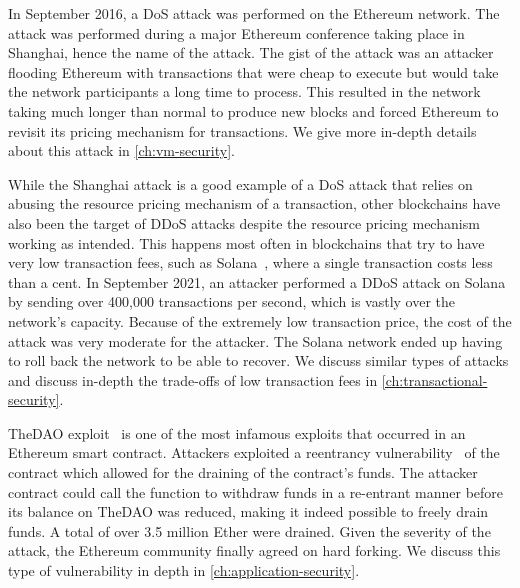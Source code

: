 In September 2016, a DoS attack was performed on the Ethereum network.
The attack was performed during a major Ethereum conference taking place in Shanghai, hence the name of the attack.
The gist of the attack was an attacker flooding Ethereum with transactions that were cheap to execute but would take the network participants a long time to process.
This resulted in the network taking much longer than normal to produce new blocks and forced Ethereum to revisit its pricing mechanism for transactions.
We give more in-depth details about this attack in \autoref{ch:vm-security}.

While the Shanghai attack is a good example of a DoS attack that relies on abusing the resource pricing mechanism of a transaction, other blockchains have also been the target of DDoS attacks despite the resource pricing mechanism working as intended.
This happens most often in blockchains that try to have very low transaction fees, such as Solana~\cite{solana}, where a single transaction costs less than a cent.
In September 2021, an attacker performed a DDoS attack on Solana by sending over 400,000 transactions per second, which is vastly over the network's capacity.
Because of the extremely low transaction price, the cost of the attack was very moderate for the attacker.
The Solana network ended up having to roll back the network to be able to recover.
We discuss similar types of attacks and discuss in-depth the trade-offs of low transaction fees in \autoref{ch:transactional-security}.

TheDAO exploit~\cite{securities2017} is one of the most infamous exploits that occurred in an Ethereum smart contract.
Attackers exploited a reentrancy vulnerability~\cite{atzei2017} of the contract which allowed for the draining of the contract's funds.
The attacker contract could call the function to withdraw funds in a re-entrant manner before its balance on TheDAO was reduced, making it indeed possible to freely drain funds.
A total of over 3.5 million Ether were drained.
Given the severity of the attack, the Ethereum community finally agreed on hard forking.
We discuss this type of vulnerability in depth in \autoref{ch:application-security}.

